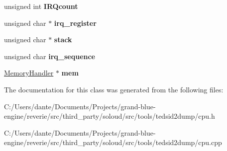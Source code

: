 \begin{DoxyCompactItemize}
unsigned int {\bfseries I\+R\+Qcount}
\item 
\mbox{\label{class_c_p_u_acb7e1001b8a89f1bb3f4f421b77b01f5}} 
unsigned char $\ast$ {\bfseries irq\+\_\+register}
\item 
\mbox{\label{class_c_p_u_a9502ebd29c4a4512540734182fb7a250}} 
unsigned char $\ast$ {\bfseries stack}
\item 
\mbox{\label{class_c_p_u_aa05666b7fbdb98c430dd7374b98f4543}} 
unsigned char {\bfseries irq\+\_\+sequence}
\item 
\mbox{\label{class_c_p_u_ac8d42d73e117388bbdd265e30f46e5b7}} 
\mbox{\hyperlink{class_memory_handler}{Memory\+Handler}} $\ast$ {\bfseries mem}
\end{DoxyCompactItemize}


The documentation for this class was generated from the following files\+:\begin{DoxyCompactItemize}
\item 
C\+:/\+Users/dante/\+Documents/\+Projects/grand-\/blue-\/engine/reverie/src/third\+\_\+party/soloud/src/tools/tedsid2dump/cpu.\+h\item 
C\+:/\+Users/dante/\+Documents/\+Projects/grand-\/blue-\/engine/reverie/src/third\+\_\+party/soloud/src/tools/tedsid2dump/cpu.\+cpp\end{DoxyCompactItemize}
